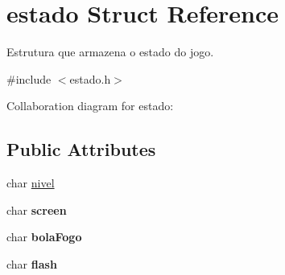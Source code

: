 \hypertarget{structestado}{}\section{estado Struct Reference}
\label{structestado}


Estrutura que armazena o estado do jogo.  




{\ttfamily \#include $<$estado.\+h$>$}



Collaboration diagram for estado\+:
\subsection*{Public Attributes}
\begin{DoxyCompactItemize}
\item 
char \hyperlink{structestado_a620f2f81ebfe4cba1d6e44b09a1762f7}{nivel}
\item 
char {\bfseries screen}\hypertarget{structestado_a9e83d6dd64bf8e642bd6089ed0429c9c}{}\label{structestado_a9e83d6dd64bf8e642bd6089ed0429c9c}

\item 
char {\bfseries bola\+Fogo}\hypertarget{structestado_ab2fb851219c49552677f99c5759797ed}{}\label{structestado_ab2fb851219c49552677f99c5759797ed}

\item 
char {\bfseries flash}\hypertarget{structestado_aabc94c34319b0500ee6eb353f35c9caa}{}\label{structestado_aabc94c34319b0500ee6eb353f35c9caa}


\end{DoxyCompactItemize}
